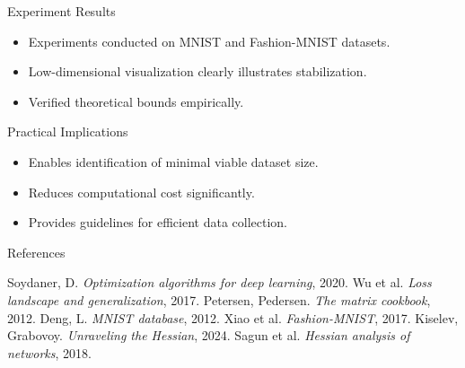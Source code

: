 \documentclass{beamer}
\begin{document}
\begin{frame}{Experiment Results}
    \begin{itemize}
        \item Experiments conducted on MNIST and Fashion-MNIST datasets.
        \item Low-dimensional visualization clearly illustrates stabilization.
        \item Verified theoretical bounds empirically.
    \end{itemize}
\end{frame}

\begin{frame}{Practical Implications}
    \begin{itemize}
        \item Enables identification of minimal viable dataset size.
        \item Reduces computational cost significantly.
        \item Provides guidelines for efficient data collection.
    \end{itemize}
\end{frame}

\begin{frame}{References}
    \scriptsize
    \begin{thebibliography}{9}
         Soydaner, D. \textit{Optimization algorithms for deep learning}, 2020.
         Wu et al. \textit{Loss landscape and generalization}, 2017.
         Petersen, Pedersen. \textit{The matrix cookbook}, 2012.
         Deng, L. \textit{MNIST database}, 2012.
         Xiao et al. \textit{Fashion-MNIST}, 2017.
         Kiselev, Grabovoy. \textit{Unraveling the Hessian}, 2024.
         Sagun et al. \textit{Hessian analysis of networks}, 2018.
    \end{thebibliography}
\end{frame}
\end{document}
